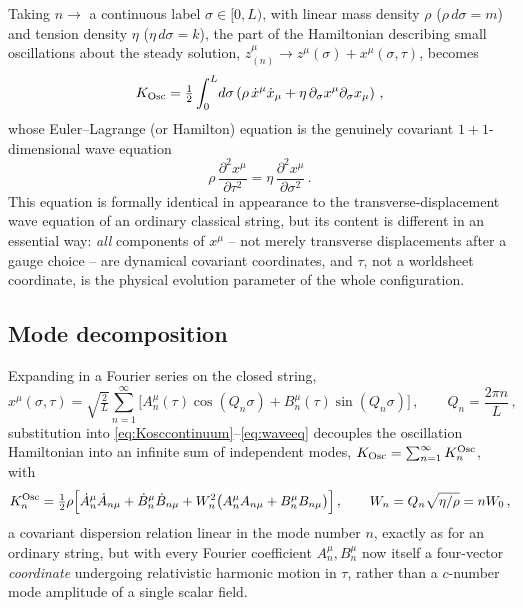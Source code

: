 \documentclass[11pt]{article}
\begin{document}
Taking $n\to$ a continuous label $\sigma\in[0,L)$, with linear mass density
$\rho$ ($\rho\,d\sigma=m$) and tension density $\eta$ ($\eta\,d\sigma=k$), the
part of the Hamiltonian describing small oscillations about the steady
solution, $z_{(n)}^\mu\to z^\mu(\sigma)+x^\mu(\sigma,\tau)$, becomes
\begin{equation}
K_{\rm Osc}=\tfrac12\int_0^L\! d\sigma\left(\rho\,\dot x^\mu\dot x_\mu+\eta\,\partial_\sigma x^\mu\partial_\sigma x_\mu\right)\,,
\label{eq:Kosccontinuum}
\end{equation}
whose Euler--Lagrange (or Hamilton) equation is the genuinely covariant
$1+1$-dimensional wave equation
\begin{equation}
\rho\,\frac{\partial^2 x^\mu}{\partial\tau^2}=\eta\,\frac{\partial^2 x^\mu}{\partial\sigma^2}\,.
\label{eq:waveeq}
\end{equation}
This equation is formally identical in appearance to the transverse-displacement
wave equation of an ordinary classical string, but its content is different in
an essential way: \emph{all} components of $x^\mu$ -- not merely transverse
displacements after a gauge choice -- are dynamical covariant coordinates, and
$\tau$, not a worldsheet coordinate, is the physical evolution parameter of the
whole configuration.

\subsection{Mode decomposition}
\label{sec:modes}

Expanding in a Fourier series on the closed string,
\begin{equation}
x^\mu(\sigma,\tau)=\sqrt{\tfrac{2}{L}}\sum_{n=1}^{\infty}
\Big[A_n^\mu(\tau)\cos(Q_n\sigma)+B_n^\mu(\tau)\sin(Q_n\sigma)\Big]\,,\qquad
Q_n=\frac{2\pi n}{L}\,,
\label{eq:fourierexp}
\end{equation}
substitution into \eqref{eq:Kosccontinuum}--\eqref{eq:waveeq} decouples the
oscillation Hamiltonian into an infinite sum of independent modes,
$K_{\rm Osc}=\sum_{n=1}^\infty K_n^{\rm Osc}$, with
\begin{equation}
K_n^{\rm Osc}=\tfrac12\rho\Big[\dot A_n^\mu\dot A_{n\mu}+\dot B_n^\mu\dot B_{n\mu}
+W_n^2\big(A_n^\mu A_{n\mu}+B_n^\mu B_{n\mu}\big)\Big]\,,\qquad
W_n=Q_n\sqrt{\eta/\rho}=nW_0\,,
\label{eq:Knosc}
\end{equation}
a covariant dispersion relation linear in the mode number $n$, exactly as for
an ordinary string, but with every Fourier coefficient $A_n^\mu,B_n^\mu$ now
itself a four-vector \emph{coordinate} undergoing relativistic harmonic motion
in $\tau$, rather than a $c$-number mode amplitude of a single scalar field.
\end{document}
